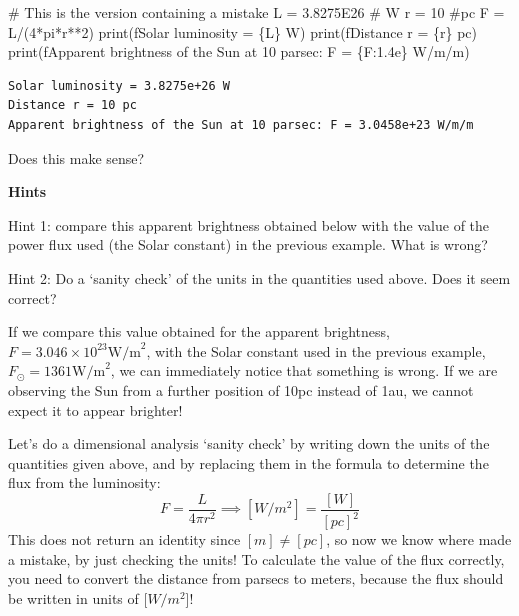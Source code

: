 \documentclass[
  letterpaper,
  DIV=11,
  numbers=noendperiod]{scrreprt}
\newenvironment{Shaded}{\begin{snugshade}}{\end{snugshade}}
\newcommand{\BuiltInTok}[1]{\textcolor[rgb]{0.00,0.23,0.31}{#1}}
\newcommand{\CommentTok}[1]{\textcolor[rgb]{0.37,0.37,0.37}{#1}}
\newcommand{\DecValTok}[1]{\textcolor[rgb]{0.68,0.00,0.00}{#1}}
\newcommand{\FloatTok}[1]{\textcolor[rgb]{0.68,0.00,0.00}{#1}}
\newcommand{\NormalTok}[1]{\textcolor[rgb]{0.00,0.23,0.31}{#1}}
\newcommand{\OperatorTok}[1]{\textcolor[rgb]{0.37,0.37,0.37}{#1}}
\newcommand{\SpecialCharTok}[1]{\textcolor[rgb]{0.37,0.37,0.37}{#1}}
\newcommand{\SpecialStringTok}[1]{\textcolor[rgb]{0.13,0.47,0.30}{#1}}
\begin{document}
\begin{Shaded}
\begin{Highlighting}[]
\CommentTok{\# This is the version containing a mistake}
\NormalTok{L }\OperatorTok{=} \FloatTok{3.8275E26} \CommentTok{\# W}
\NormalTok{r }\OperatorTok{=} \DecValTok{10} \CommentTok{\#pc}
\NormalTok{F }\OperatorTok{=}\NormalTok{ L}\OperatorTok{/}\NormalTok{(}\DecValTok{4}\OperatorTok{*}\NormalTok{pi}\OperatorTok{*}\NormalTok{r}\OperatorTok{**}\DecValTok{2}\NormalTok{)}
\BuiltInTok{print}\NormalTok{(}\SpecialStringTok{f\textquotesingle{}Solar luminosity = }\SpecialCharTok{\{}\NormalTok{L}\SpecialCharTok{\}}\SpecialStringTok{ W\textquotesingle{}}\NormalTok{)}
\BuiltInTok{print}\NormalTok{(}\SpecialStringTok{f\textquotesingle{}Distance r = }\SpecialCharTok{\{}\NormalTok{r}\SpecialCharTok{\}}\SpecialStringTok{ pc\textquotesingle{}}\NormalTok{)}
\BuiltInTok{print}\NormalTok{(}\SpecialStringTok{f\textquotesingle{}Apparent brightness of the Sun at 10 parsec: F = }\SpecialCharTok{\{}\NormalTok{F}\SpecialCharTok{:1.4e\}}\SpecialStringTok{ W/m/m\textquotesingle{}}\NormalTok{)}
\end{Highlighting}
\end{Shaded}

\begin{verbatim}
Solar luminosity = 3.8275e+26 W
Distance r = 10 pc
Apparent brightness of the Sun at 10 parsec: F = 3.0458e+23 W/m/m
\end{verbatim}

Does this make sense?

\textbf{Hints}

Hint 1: compare this apparent brightness obtained below with the value
of the power flux used (the Solar constant) in the previous example.
What is wrong?

Hint 2: Do a `sanity check' of the units in the quantities used above.
Does it seem correct?

If we compare this value obtained for the apparent brightness,
\(F=3.046\times 10^{23} \mathrm{W/m}^2\), with the Solar constant used
in the previous example, \(F_\odot = 1361 \mathrm{W/m}^2\), we can
immediately notice that something is wrong. If we are observing the Sun
from a further position of 10pc instead of 1au, we cannot expect it to
appear brighter!

Let's do a dimensional analysis `sanity check' by writing down the units
of the quantities given above, and by replacing them in the formula to
determine the flux from the luminosity:
\[ F=\frac{L}{4\pi r^2} \implies [W/m^2] = \frac{[W]}{[pc]^2} \] This
does not return an identity since \([m]\neq [pc]\), so now we know where
made a mistake, by just checking the units! To calculate the value of
the flux correctly, you need to convert the distance from parsecs to
meters, because the flux should be written in units of {[}\(W/m^2\){]}!
\end{document}
